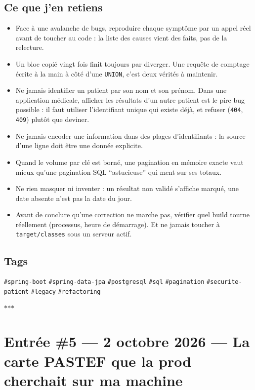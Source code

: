 \documentclass[10pt,twoside,openany]{article}
\newcommand{\entryrule}{\par\vspace{1.2em}\begin{center}\color{accentblue}$\ast$\quad$\ast$\quad$\ast$\end{center}\par}
\newcommand{\tag}[1]{\texttt{\footnotesize\color{tagolive}\#{#1}}}
\begin{document}
\subsection*{Ce que j'en retiens}
\begin{itemize}
  \item Face à une avalanche de bugs, reproduire chaque symptôme par un appel réel avant de toucher au code : la liste des causes vient des faits, pas de la relecture.
  \item Un bloc copié vingt fois finit toujours par diverger. Une requête de comptage écrite à la main à côté d'une \texttt{UNION}, c'est deux vérités à maintenir.
  \item Ne jamais identifier un patient par son nom et son prénom. Dans une application médicale, afficher les résultats d'un autre patient est le pire bug possible : il faut utiliser l'identifiant unique qui existe déjà, et refuser (\texttt{404}, \texttt{409}) plutôt que deviner.
  \item Ne jamais encoder une information dans des plages d'identifiants : la source d'une ligne doit être une donnée explicite.
  \item Quand le volume par clé est borné, une pagination en mémoire exacte vaut mieux qu'une pagination SQL \enquote{astucieuse} qui ment sur ses totaux.
  \item Ne rien masquer ni inventer : un résultat non validé s'affiche marqué, une date absente n'est pas la date du jour.
  \item Avant de conclure qu'une correction ne marche pas, vérifier quel build tourne réellement (processus, heure de démarrage). Et ne jamais toucher à \texttt{target/classes} sous un serveur actif.
\end{itemize}

\subsection*{Tags}
\tag{spring-boot} \quad \tag{spring-data-jpa} \quad \tag{postgresql} \quad \tag{sql} \quad \tag{pagination} \quad \tag{securite-patient} \quad \tag{legacy} \quad \tag{refactoring}

\entryrule

\section{Entrée \#5 --- 2 octobre 2026 --- La carte PASTEF que la prod cherchait sur ma machine}
\end{document}
